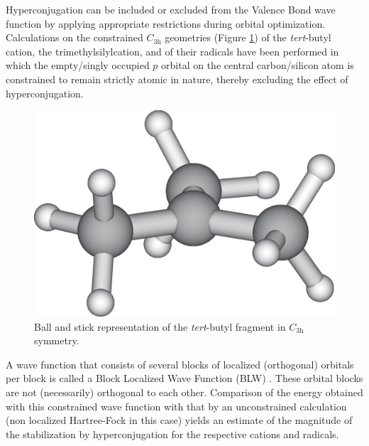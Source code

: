 Hyperconjugation can be included or excluded from the Valence Bond wave function by applying appropriate restrictions during orbital optimization.  Calculations on the constrained $C_\mathrm{3h}$ geometries (Figure \ref{ch3.fig.c3h}) of the \textit{tert}-butyl cation, the trimethylsilylcation, and of their radicals have been performed in which the empty/singly occupied $p$ orbital on the central carbon/silicon atom is constrained to remain strictly atomic in nature, thereby excluding the effect of hyperconjugation.
\begin{figure}[ht]
\center
\includegraphics[scale=0.3]{dissociation/figures/c3h.eps}
\caption{Ball and stick representation of the \textit{tert}-butyl fragment in $C_\mathrm{3h}$ symmetry.}
\label{ch3.fig.c3h}
\end{figure}
A wave function that consists of several blocks of localized (orthogonal) orbitals per block is called a Block Localized Wave Function (BLW) \cite{blw}. These orbital blocks are not (necessarily) orthogonal to each other. Comparison of the energy obtained with this constrained wave function with that by an unconstrained calculation  (non localized Hartree-Fock in this case) yields an estimate of the magnitude of the stabilization by hyperconjugation for the respective cations and radicals. 

